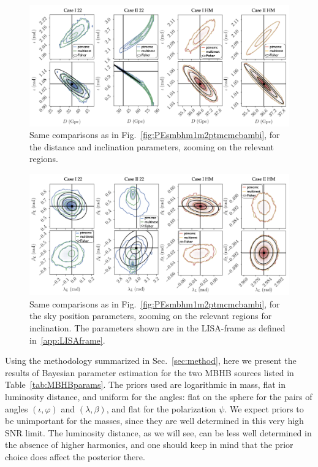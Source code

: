 \documentclass[aps,showpacs,twocolumn,prd,superscriptaddress,nofootinbib]{revtex4-1}
\begin{document}
\begin{figure}
  \centering
  \includegraphics[width=.98\linewidth]{row_Dinc_ptmcmc_bambi.png}
  \caption{Same comparisons as in Fig.~\ref{fig:PEsmbhm1m2ptmcmcbambi}, for the distance and inclination parameters, zooming on the relevant regions.}
  \label{fig:PEsmbhDincptmcmcbambi}
\end{figure}

\begin{figure}
  \centering
  \includegraphics[width=.98\linewidth]{row_sky_ptmcmc_bambi.png}
  \caption{Same comparisons as in Fig.~\ref{fig:PEsmbhm1m2ptmcmcbambi}, for the sky position parameters, zooming on the relevant regions for inclination. The parameters shown are in the LISA-frame as defined in~\ref{app:LISAframe}.}
  \label{fig:PEsmbhskyptmcmcbambi}
\end{figure}

Using the methodology summarized in Sec.~\ref{sec:method}, here we present the results of Bayesian parameter estimation for the two MBHB sources listed in Table~\ref{tab:MBHBparams}.
The priors used are logarithmic in mass, flat in luminosity distance, and uniform for the angles: flat on the sphere for the pairs of angles $(\iota, \varphi)$ and $(\lambda, \beta)$, and flat for the polarization $\psi$. We expect priors to be unimportant for the masses, since they are well determined in this very high SNR limit. The luminosity distance, as we will see, can be less well determined in the absence of higher harmonics, and one should keep in mind that the prior choice does affect the posterior there.
\end{document}
